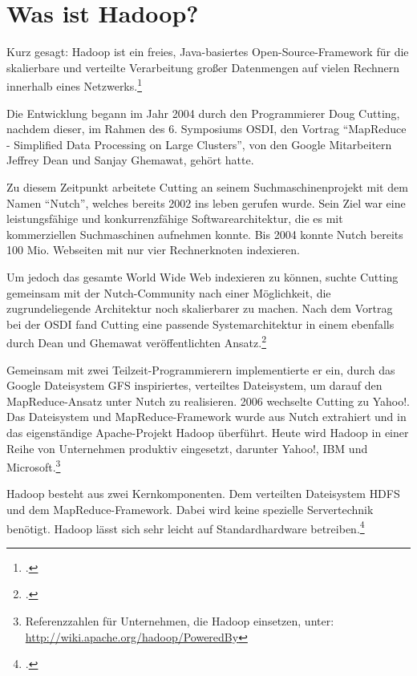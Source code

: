 \section{Was ist Hadoop?}\label{sec:WasIstHadoop}
\flqq Kurz gesagt: Hadoop ist ein freies, Java-basiertes Open-Source-Framework für die skalierbare und verteilte Verarbeitung großer Datenmengen auf vielen Rechnern innerhalb eines Netzwerks.\frqq\footcite[S. 21]{Wartala.2012}

Die Entwicklung begann im Jahr 2004 durch den Programmierer Doug Cutting, nachdem dieser, im Rahmen des 6. Symposiums \ac{OSDI}, den Vortrag "`MapReduce - Simplified Data Processing on Large Clusters"', von den Google Mitarbeitern Jeffrey Dean und Sanjay Ghemawat, gehört hatte.

Zu diesem Zeitpunkt arbeitete Cutting an seinem Suchmaschinenprojekt mit dem Namen "`Nutch"', welches bereits 2002 ins leben gerufen wurde. Sein Ziel war eine leistungsfähige und konkurrenzfähige Softwarearchitektur, die es mit kommerziellen Suchmaschinen aufnehmen konnte. Bis 2004 konnte Nutch bereits 100 Mio. Webseiten mit nur vier Rechnerknoten indexieren.

Um jedoch das gesamte World Wide Web indexieren zu können, suchte Cutting gemeinsam mit der Nutch-Community nach einer Möglichkeit, die zugrundeliegende Architektur noch skalierbarer zu machen. Nach dem Vortrag bei der \ac{OSDI} fand Cutting eine passende Systemarchitektur in einem ebenfalls durch Dean und Ghemawat veröffentlichten Ansatz.\footcite[Näheres siehe][]{Dean.2004}

Gemeinsam mit zwei Teilzeit-Programmierern implementierte er ein, durch das Google Dateisystem \ac{GFS} inspiriertes, verteiltes Dateisystem, um darauf den MapReduce-Ansatz unter Nutch zu realisieren. 2006 wechselte Cutting zu Yahoo!. Das Dateisystem und MapReduce-Framework wurde aus Nutch extrahiert und in das eigenständige Apache-Projekt Hadoop überführt. Heute wird Hadoop in einer Reihe von Unternehmen produktiv eingesetzt, darunter Yahoo!, IBM und Microsoft.\footnote{Referenzzahlen für Unternehmen, die Hadoop einsetzen, unter:\\ \url{http://wiki.apache.org/hadoop/PoweredBy}}

Hadoop besteht aus zwei Kernkomponenten. Dem verteilten Dateisystem \ac{HDFS} und dem MapReduce-Framework. Dabei wird keine spezielle Servertechnik benötigt. Hadoop lässt sich sehr leicht auf Standardhardware betreiben.\footcite[Vgl.][S. 19-22]{Wartala.2012}

